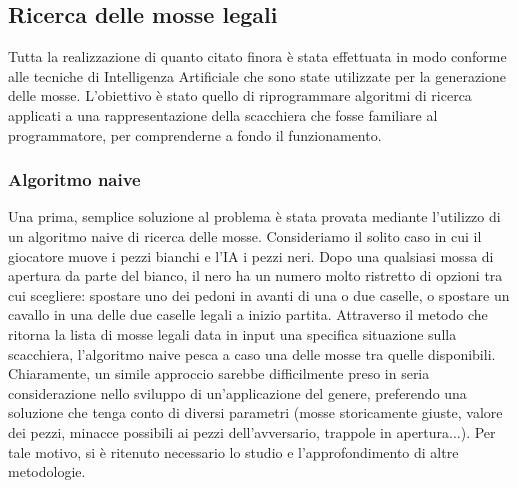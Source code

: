 \subsection{Ricerca delle mosse legali}
Tutta la realizzazione di quanto citato finora è stata effettuata in modo conforme alle tecniche di Intelligenza Artificiale che sono state utilizzate per la generazione delle mosse. L'obiettivo è stato quello di riprogrammare algoritmi di ricerca applicati a una rappresentazione della scacchiera che fosse familiare al programmatore, per comprenderne a fondo il funzionamento. 

\subsubsection{Algoritmo naive}
Una prima, semplice soluzione al problema è stata provata mediante l'utilizzo di un algoritmo naive di ricerca delle mosse. Consideriamo il solito caso in cui il giocatore muove i pezzi bianchi e l'IA i pezzi neri. Dopo una qualsiasi mossa di apertura da parte del bianco, il nero ha un numero molto ristretto di opzioni tra cui scegliere: spostare uno dei pedoni in avanti di una o due caselle, o spostare un cavallo in una delle due caselle legali a inizio partita. Attraverso il metodo che ritorna la lista di mosse legali data in input una specifica situazione sulla scacchiera, l'algoritmo naive pesca a caso una delle mosse tra quelle disponibili. Chiaramente, un simile approccio sarebbe difficilmente preso in seria considerazione nello sviluppo di un'applicazione del genere, preferendo una soluzione che tenga conto di diversi parametri (mosse storicamente giuste, valore dei pezzi, minacce possibili ai pezzi dell'avversario, trappole in apertura...). Per tale motivo, si è ritenuto necessario lo studio e l'approfondimento di altre metodologie. 

